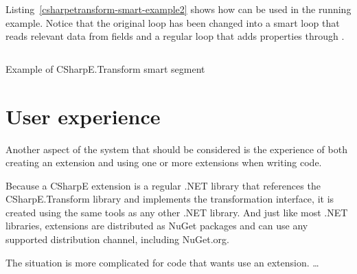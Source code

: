 Listing~\ref{csharpetransform-smart-example2} shows how  can be used in the running example. Notice that the original  loop has been changed into a smart loop that reads relevant data from fields and a regular  loop that adds properties through .

\begin{listing}
\inputminted[firstline=9,lastline=30]{csharp}{samples/CSharpETransform.Smart2/EntityTransformation.cs}
\caption{Example of CSharpE.Transform smart segment}
\label{csharpetransform-smart-example2}
\end{listing}

\section{User experience}

Another aspect of the system that should be considered is the experience of both creating an extension and using one or more extensions when writing code.

Because a CSharpE extension is a regular .NET library that references the CSharpE.Transform library and implements the transformation interface, it is created using the same tools as any other .NET library. And just like most .NET libraries, extensions are distributed as NuGet packages and can use any supported distribution channel, including NuGet.org.

The situation is more complicated for code that wants use an extension. \dots

\bigskip


